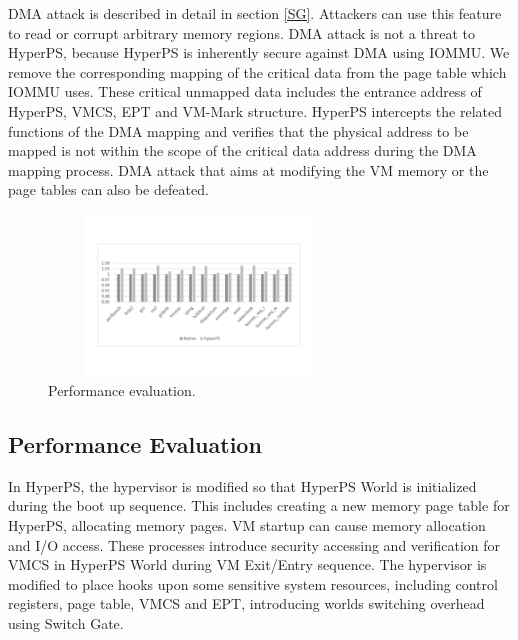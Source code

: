 ﻿\documentclass[conference]{IEEEtran}
\begin{document}
 DMA attack is described in detail in section \ref{SG}. Attackers can use this feature to read or corrupt arbitrary memory regions. DMA attack is not a threat to HyperPS, because HyperPS is inherently secure against DMA using IOMMU. We remove the corresponding mapping of the critical data from the page table which IOMMU uses. These critical unmapped data includes the entrance address of HyperPS, VMCS, EPT and VM-Mark structure. 
HyperPS intercepts the related functions of the DMA mapping and verifies that the physical address to be mapped is not within the scope of the critical data address during the DMA mapping process.
DMA attack that aims at modifying the VM memory or the page tables can also be defeated.


\begin{figure}
\centerline{\includegraphics[width=8cm,height=4.3cm]{performance2.pdf}}
\caption{Performance evaluation.} \label{fig5}
\end{figure}


\subsection{Performance Evaluation}

In HyperPS, the hypervisor is modified so that HyperPS World is initialized during the boot up sequence. This includes creating a new memory page table for HyperPS, allocating memory pages. VM startup can cause memory allocation and I/O access. 
These processes introduce security accessing and verification for VMCS in HyperPS World during VM Exit/Entry sequence.
The hypervisor is modified to place hooks upon some sensitive system resources, including control registers, page table, VMCS and EPT,
introducing worlds switching overhead using Switch Gate.
\end{document}

